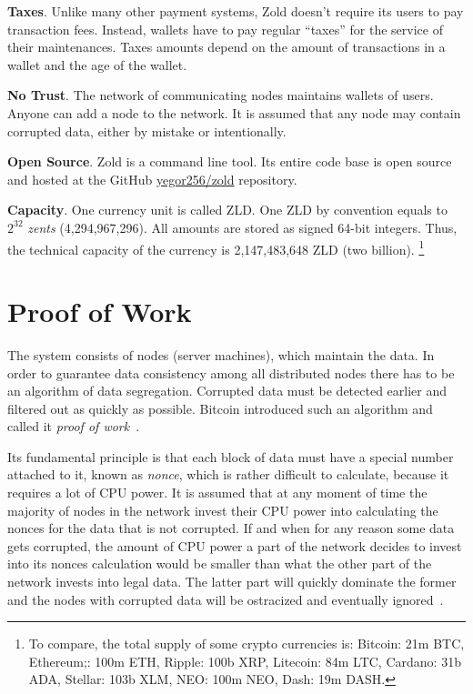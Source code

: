 \documentclass[11pt,oneside]{article}
\begin{document}
\textbf{Taxes}.
Unlike many other payment systems, Zold doesn't require its users
to pay transaction fees. Instead, wallets have to pay regular ``taxes'' for the
service of their maintenances. Taxes amounts depend on the amount
of transactions in a wallet and the age of the wallet.

\textbf{No Trust}.
The network of communicating nodes maintains wallets of users.
Anyone can add a node to the network.
It is assumed that any node may contain corrupted data, either by mistake or intentionally.

\textbf{Open Source}.
Zold is a command line tool. Its entire code base is open source
and hosted at the GitHub \href{https://github.com/yegor256/zold}{yegor256/zold}
repository.

\textbf{Capacity}.
One currency unit is called ZLD.
One ZLD by convention equals to $2^{32}$ \emph{zents} (4,294,967,296).
All amounts are stored as signed 64-bit integers.
Thus, the technical capacity of the currency is 2,147,483,648 ZLD (two billion).%
\footnote{%
  To compare, the total supply of some crypto currencies is:
  Bitcoin: 21m BTC,
  Ethereum;: 100m ETH,
  Ripple: 100b XRP,
  Litecoin: 84m LTC,
  Cardano: 31b ADA,
  Stellar: 103b XLM,
  NEO: 100m NEO,
  Dash: 19m DASH.
}


\section{Proof of Work}

The system consists of nodes (server machines), which maintain the data.
In order to guarantee data consistency among all distributed nodes
there has to be an algorithm of data segregation.
Corrupted data must be detected earlier and filtered out as quickly as possible.
Bitcoin introduced such an algorithm and called it \emph{proof of work}~\parencite{nakamoto2008}.

Its fundamental principle is that each block of data must have a special
number attached to it, known as \emph{nonce}, which is rather difficult to calculate,
because it requires a lot of CPU power. It is assumed that at any moment
of time the majority of nodes in the network invest their CPU power into
calculating the nonces for the data that is not corrupted. If and when for any reason
some data gets corrupted, the amount of CPU power a part of the network
decides to invest into its nonces calculation would be smaller than what
the other part of the network invests into legal data. The latter part
will quickly dominate the former and the nodes with corrupted data will
be ostracized and eventually ignored~\parencite{nakamoto2008}.
\end{document}
